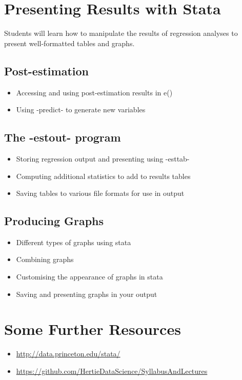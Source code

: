 \documentclass{scrartcl}
\begin{document}
\section{Presenting Results with Stata}
Students will learn how to manipulate the results of regression analyses to present well-formatted tables and graphs.
\subsection{Post-estimation}
\begin{itemize}
  \item Accessing and using post-estimation results in e()
  \item Using -predict- to generate new variables
\end{itemize}

\subsection{The -estout- program}
\begin{itemize}
  \item Storing regression output and presenting using -esttab-
  \item Computing additional statistics to add to results tables
  \item Saving tables to various file formats for use in output
\end{itemize}

\subsection{Producing Graphs}
\begin{itemize}
  \item Different types of graphs using stata
  \item Combining graphs
  \item Customising the appearance of graphs in stata
  \item Saving and presenting graphs in your output
\end{itemize}



\section*{Some Further Resources}
\begin{itemize}
  \item \url{http://data.princeton.edu/stata/}
  \item \url{https://github.com/HertieDataScience/SyllabusAndLectures}
\end{itemize}



\end{document}
